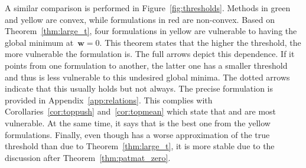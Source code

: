 A similar comparison is performed in Figure~\ref{fig:thresholds}. Methods in green and yellow are convex, while formulations in red are non-convex. Based on Theorem~\ref{thm:large_t}, four formulations in yellow are vulnerable to having the global minimum at~$\bm{w}=0$. This theorem states that the higher the threshold, the more vulnerable the formulation is. The full arrows depict this dependence. If it points from one formulation to another, the latter one has a smaller threshold and thus is less vulnerable to this undesired global minima. The dotted arrows indicate that this usually holds but not always. The precise formulation is provided in Appendix~\ref{app:relations}. This complies with Corollaries~\ref{cor:toppush} and~\ref{cor:topmean} which state that \TopPush and \TopMeanK are most vulnerable. At the same time, it says that \tauFPL is the best one from the yellow formulations. Finally, even though \PatMatNP has a worse approximation of the true threshold than \tauFPL due to Theorem~\ref{thm:large_t}, it is more stable due to the discussion after Theorem~\ref{thm:patmat_zero}.

